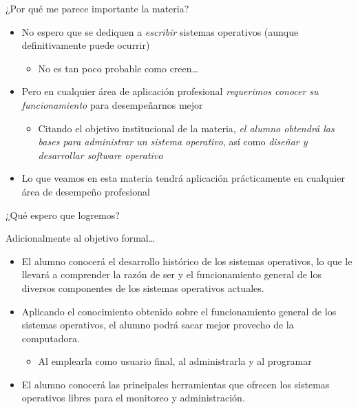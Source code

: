 \documentclass[presentation]{beamer}
\begin{document}
\begin{frame}[label={sec:org5885d4a}]{¿Por qué me parece importante la materia?}
\begin{itemize}
\item No espero que se dediquen a \emph{escribir} sistemas operativos (aunque
definitivamente puede ocurrir)
\begin{itemize}
\item No es tan poco probable como creen\ldots{}
\end{itemize}
\item Pero en cualquier área de aplicación profesional \emph{requerimos conocer
su funcionamiento} para desempeñarnos mejor
\begin{itemize}
\item Citando el objetivo institucional de la materia, \emph{el alumno
obtendrá las bases para administrar un sistema operativo}, así
como \emph{diseñar y desarrollar software operativo}
\end{itemize}
\item Lo que veamos en esta materia tendrá aplicación prácticamente en
cualquier área de desempeño profesional
\end{itemize}
\end{frame}

\begin{frame}[label={sec:orgb4981fd}]{¿Qué espero que logremos?}
\begin{center}
\scriptsize
Adicionalmente al objetivo formal\ldots{}
\end{center}
\begin{itemize}
\item El alumno conocerá el desarrollo histórico de los sistemas
operativos, lo que le llevará a comprender la razón de ser y el
funcionamiento general de los diversos componentes de los sistemas
operativos actuales.
\item Aplicando el conocimiento obtenido sobre el funcionamiento general
de los sistemas operativos, el alumno podrá sacar mejor provecho de
la computadora.
\begin{itemize}
\item Al emplearla como usuario final, al administrarla y al programar
\end{itemize}
\item El alumno conocerá las principales herramientas que ofrecen los
sistemas operativos libres para el monitoreo y administración.
\end{itemize}
\end{frame}
\end{document}
